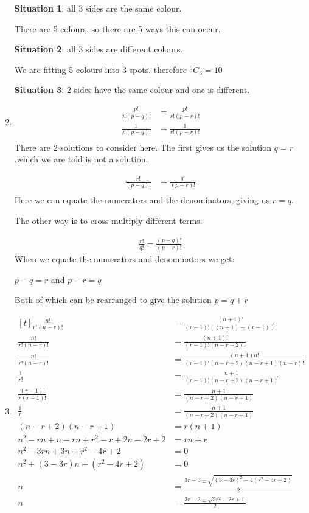 \documentclass[../main.tex]{subfiles}
\begin{document}
\begin{enumerate}
    \textbf{Situation 1}: all 3 sides are the same colour.

    There are 5 colours, so there are 5 ways this can occur.

    \textbf{Situation 2}: all 3 sides are different colours.

    We are fitting 5 colours into 3 spots, therefore \(^5C_3=10\)

    \textbf{Situation 3}: 2 sides have the same colour and one is different.

    

    \item 
    \begin{align*}
        \frac{p!}{q!(p-q)!}
        &=\frac{p!}{r!(p-r)!}\\
        \frac{1}{q!(p-q)!}
        &=\frac{1}{r!(p-r)!}\\
    \end{align*}
    There are 2 solutions to consider here. The first gives us the solution \(q=r \),which we are told is not a solution.

    \begin{align*}
        \frac{r!}{(p-q)!}
        &=\frac{q!}{(p-r)!}\\
    \end{align*}
    Here we can equate the numerators and the denominators, giving us \(r=q\).

    The other way is to cross-multiply different terms:

    \begin{align*}
    \frac{r!}{q!}=\frac{(p-q)!}{(p-r)!}
    \end{align*}
    When we equate the numerators and denominators we get:

    \(p-q=r\) and \(p-r=q\)

    Both of which can be rearranged to give the solution \(p=q+r\)
    \item 
    $
    \!
    \begin{aligned}[t]
    \frac{n!}{r!(n-r)!}
    &=\frac{(n+1)!}{(r-1)!((n+1)-(r-1))!}\\
    \frac{n!}{r!(n-r)!}
    &=\frac{(n+1)!}{(r-1)!(n-r+2)!}\\
    \frac{n!}{r!(n-r)!}
    &=\frac{(n+1)n!}{(r-1)!(n-r+2)(n-r+1)(n-r)!}\\
    \frac{1}{r!}
    &=\frac{n+1}{(r-1)!(n-r+2)(n-r+1)}\\
    \frac{(r-1)!}{r(r-1)!}
    &=\frac{n+1}{(n-r+2)(n-r+1)}\\
    \frac{1}{r}
    &=\frac{n+1}{(n-r+2)(n-r+1)}\\
    (n-r+2)(n-r+1)
    &=r(n+1)\\
    n^2 - rn + n -rn+r^2-r+2n-2r+2
    &=rn+r\\
    n^2-3rn+3n+r^2-4r+2
    &=0\\
    n^2+(3-3r)n+(r^2-4r+2)
    &=0\\
    n
    &=\frac{3r-3 \pm \sqrt{(3-3r)^2-4(r^2-4r+2)}}{2}\\
    n
    &=\frac{3r-3 \pm \sqrt{5r^2-2r+1}}{2}
    \end{aligned}
    $


\end{enumerate}
\end{document}
